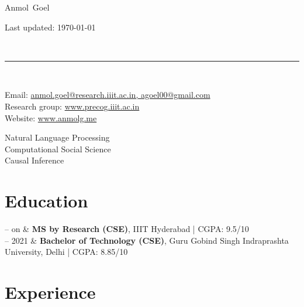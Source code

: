\documentclass[10pt, a4paper]{article}
\makeatletter
\newcommand{\FirstName}{Anmol}
\newcommand{\LastName}{Goel}
\newcommand{\MyName}{\FirstName\ \LastName}
\newcommand{\Email}{anmol.goel@research.iiit.ac.in, agoel00@gmail.com}
\newcommand{\PersonalWebsite}{www.anmolg.me}
\newcommand{\LabWebsite}{www.precog.iiit.ac.in}
\newcommand{\ORCID}{0000-0001-6123-9515}
\newcommand{\Website}[1]{\href{https://#1}{#1}}
\newcommand{\Duration}[2]{\fontsize{9pt}{0}\selectfont #1 -- #2}
\newcommand{\Ongoing}{on}
\makeatother
\begin{document}
\thispagestyle{empty}

\begin{minipage}[t]{0.7\textwidth}
{\fontsize{22pt}{0}\selectfont\MyName}
\end{minipage}
\begin{minipage}[t]{0.3\textwidth}
  \begin{flushright}
    Last updated: \monthyear\today
  \end{flushright}
\end{minipage}
\\[-0.1cm]
\rule{\textwidth}{2pt}
\\[0.1cm]
\begin{minipage}[t]{0.7\textwidth}
    Email: \href{mailto:\Email}{\Email}
    \\
    Research group: \Website{\LabWebsite}
    \\
    Website: \Website{\PersonalWebsite}
\end{minipage}
\begin{minipage}[t]{0.3\textwidth}
  \begin{flushright}
    Natural Language Processing \\ 
    Computational Social Science \\
    Causal Inference
  \end{flushright}
\end{minipage}



\section{Education}

\begin{EntriesTable}
  \Duration{2022}{\Ongoing}  &
  \textbf{MS by Research (CSE)}, IIIT Hyderabad | CGPA: 9.5/10
  \\
  \Duration{2017}{2021}  &
  \textbf{Bachelor of Technology (CSE)}, Guru Gobind Singh Indraprashta University, Delhi | CGPA: 8.85/10 
\end{EntriesTable}


\section{Experience}
\end{document}
